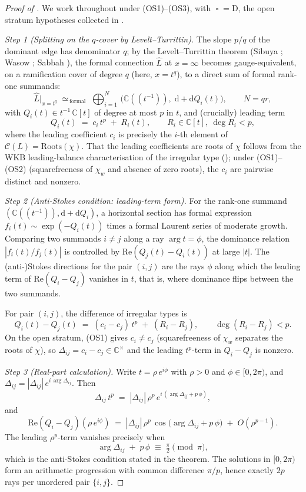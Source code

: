 \documentclass[11pt,a4paper]{article}
\theoremstyle{plain}
\theoremstyle{definition}
\theoremstyle{remark}
\newcommand{\op}{\mathop{\square}}                %
\newcommand{\opD}{\mathrm{D}}                     %
\newcommand{\Roots}{\mathrm{Roots}}
\newcommand{\Cl}{\mathcal{C}}
\newcommand{\Dij}{\Delta_{ij}}
\DeclareMathOperator{\arginline}{arg}
\begin{document}
\begin{proof}[Proof of ]
We work throughout under (OS1)--(OS3), with $\op = \opD$, the open
stratum hypotheses collected in .

\smallskip
\textit{Step 1 (Splitting on the $q$-cover by Levelt--Turrittin).}
The slope $p/q$ of the dominant edge has denominator $q$; by the
Levelt--Turrittin theorem (Sibuya \cite{sibuya}; Wasow
\cite[Ch.~VII, Thms.~19.1, 19.2]{wasow}; Sabbah
\cite[Ch.~II, Thm.~II.2.4]{sabbah-isomon}), the formal connection
$\widehat{L}$ at $x = \infty$ becomes gauge-equivalent, on a
ramification cover of degree $q$ (here, $x = t^q$), to a direct sum
of formal rank-one summands:
\[
   \widehat{L}\big|_{x = t^q}
   \;\simeq_{\,\mathrm{formal}}\;
   \bigoplus_{i = 1}^{N}\,
   \big(\mathbb{C}((t^{-1})),\; \mathrm{d} + \mathrm{d} Q_i(t)\big),
   \qquad N = qr,
\]
with $Q_i(t) \in t^{-1}\, \mathbb{C}[t]$ of degree at most $p$ in $t$,
and (crucially) leading term
\[
   Q_i(t) \;=\; c_i\, t^p \;+\; R_i(t),
   \qquad
   R_i \in \mathbb{C}[t],\ \deg R_i < p,
\]
where the leading coefficient $c_i$ is precisely the $i$-th element
of $\Cl(L) = \Roots(\chi)$. That the leading coefficients are roots
of $\chi$ follows from the WKB leading-balance characterisation of
the irregular type (\cite[Ch.~II, \S 1.3]{sabbah-isomon}); under
(OS1)--(OS2) (squarefreeness of $\chi_w$ and absence of zero roots),
the $c_i$ are pairwise distinct and nonzero.

\smallskip
\textit{Step 2 (Anti-Stokes condition: leading-term form).}
For the rank-one summand $(\mathbb{C}((t^{-1})), \mathrm{d} +
\mathrm{d} Q_i)$, a horizontal section has formal expression
$f_i(t) \sim \exp(-Q_i(t))$ times a formal Laurent series of moderate
growth. Comparing two summands $i \ne j$ along a ray $\arg t = \phi$,
the dominance relation $|f_i(t)/f_j(t)|$ is controlled by
$\mathrm{Re}(Q_j(t) - Q_i(t))$ at large $|t|$. The (anti-)Stokes
directions for the pair $(i, j)$ are the rays $\phi$ along which the
leading term of $\mathrm{Re}(Q_i - Q_j)$ vanishes in $t$, that is,
where dominance flips between the two summands.

For pair $(i, j)$, the difference of irregular types is
\[
   Q_i(t) - Q_j(t) \;=\; (c_i - c_j)\, t^p \;+\; (R_i - R_j),
   \qquad \deg(R_i - R_j) < p.
\]
On the open stratum, (OS1) gives $c_i \ne c_j$ (squarefreeness of
$\chi_w$ separates the roots of $\chi$), so $\Dij = c_i - c_j \in
\mathbb{C}^\times$ and the leading $t^p$-term in $Q_i - Q_j$ is
nonzero.

\smallskip
\textit{Step 3 (Real-part calculation).}
Write $t = \rho\, e^{i\phi}$ with $\rho > 0$ and $\phi \in
[0, 2\pi)$, and $\Dij = |\Dij|\, e^{i\, \arginline \Dij}$. Then
\[
   \Dij\, t^p \;=\; |\Dij|\, \rho^p\, e^{i\, (\arginline \Dij + p\, \phi)},
\]
and
\[
   \mathrm{Re}(Q_i - Q_j)(\rho\, e^{i\phi})
   \;=\;
   |\Dij|\, \rho^p\, \cos\!\big(\arginline \Dij + p\, \phi\big)
   \;+\; O(\rho^{p-1}).
\]
The leading $\rho^p$-term vanishes precisely when
\[
   \arginline \Dij \;+\; p\, \phi \;\equiv\;
   \tfrac{\pi}{2} \pmod{\pi},
\]
which is the anti-Stokes condition stated in the theorem. The
solutions in $[0, 2\pi)$ form an arithmetic progression with
common difference $\pi / p$, hence exactly $2p$ rays per
unordered pair $\{i, j\}$.


\end{proof}
\end{document}
